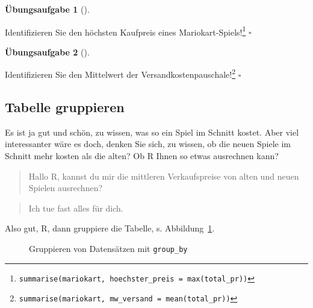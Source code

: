 \documentclass[
  letterpaper,
  twoside,
  open=any]{scrbook}
\theoremstyle{definition}
\newtheorem{exercise}{Übungsaufgabe}[chapter]
\theoremstyle{definition}
\theoremstyle{definition}
\theoremstyle{remark}
\begin{document}
\begin{exercise}[]\protect\hypertarget{exr-summarise}{}\label{exr-summarise}

Identifizieren Sie den höchsten Kaufpreis eines
Mariokart-Spiels!\footnote{\texttt{summarise(mariokart,\ hoechster\_preis\ =\ max(total\_pr))}}
\(\square\)

\end{exercise}

\begin{exercise}[]\protect\hypertarget{exr-summarise2}{}\label{exr-summarise2}

Identifizieren Sie den Mittelwert der Versandkostenpauschale!\footnote{\texttt{summarise(mariokart,\ mw\_versand\ =\ mean(total\_pr))}}
\(\square\)

\end{exercise}

\subsection{Tabelle gruppieren}\label{tabelle-gruppieren}

Es ist ja gut und schön, zu wissen, was so ein Spiel im Schnitt kostet.
Aber viel interessanter wäre es doch, denken Sie sich, zu wissen, ob die
neuen Spiele im Schnitt mehr kosten als die alten? Ob R Ihnen so etwas
ausrechnen kann?

\begin{quote}
{} Hallo R, kannst du mir die mittleren Verkaufspreise
von alten und neuen Spielen ausrechnen?
\end{quote}

\begin{quote}
{} Ich tue fast alles für dich. {}
\end{quote}

Also gut, R, dann gruppiere die Tabelle, s. Abbildung~\ref{fig-group}.

\begin{figure}


\caption{\label{fig-group}Gruppieren von Datensätzen mit
\texttt{group\_by}}

\end{figure}%
\end{document}
